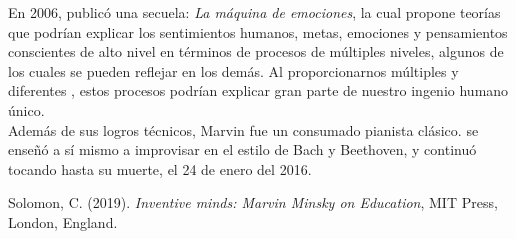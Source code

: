 \documentclass[a4paper,12pt]{article}
\begin{document}
En 2006, publicó una secuela: \textit{La máquina de emociones}, la cual propone teorías que podrían explicar los sentimientos humanos, metas, emociones y pensamientos conscientes de alto nivel en términos de procesos de múltiples niveles, algunos de los cuales se pueden reflejar en los demás. Al proporcionarnos múltiples y diferentes , estos procesos podrían explicar gran parte de nuestro ingenio humano único.\\
Además de sus logros técnicos, Marvin fue un consumado pianista clásico. se enseñó a sí mismo a improvisar en el estilo de Bach y Beethoven, y continuó tocando hasta su muerte, el 24 de enero del 2016.
\begin{thebibliography}{9}
Solomon, C. (2019). \emph{Inventive minds: Marvin Minsky on Education}, MIT Press, London, England.
\end{thebibliography}
\end{document}
